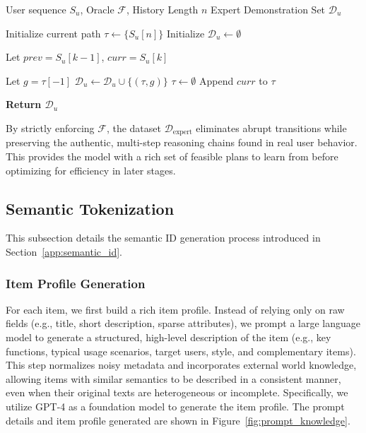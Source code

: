 \begin{algorithm}[tb]
   \caption{Goal-oriented Trajectory Mining}
   \label{alg:mining}
\begin{algorithmic}[1]
    User sequence $S_u$, Oracle $\mathcal{F}$, History Length $n$
    Expert Demonstration Set $\mathcal{D}_{u}$
   
   \STATE Initialize current path $\tau \leftarrow \{ S_u[n] \}$
   \STATE Initialize $\mathcal{D}_{u} \leftarrow \emptyset$

       \STATE Let $prev = S_u[k-1]$, $curr = S_u[k]$
       
           \STATE {}
               \STATE Let $g = \tau[-1]$ 
               \STATE $\mathcal{D}_{u} \leftarrow \mathcal{D}_{u} \cup \{(\tau, g)\}$ 
           \ENDIF
           \STATE $\tau \leftarrow \emptyset $ 
       \ENDIF
       \STATE Append $curr$ to $\tau$
   \ENDFOR
   
   \STATE \bfseries Return $\mathcal{D}_{u}$
\end{algorithmic}
\end{algorithm}

By strictly enforcing $\mathcal{F}$, the dataset $\mathcal{D}_{\text{expert}}$ eliminates abrupt transitions while preserving the authentic, multi-step reasoning chains found in real user behavior. This provides the model with a rich set of feasible plans to learn from before optimizing for efficiency in later stages.

\subsection{Semantic Tokenization}
\label{app:semantic}

This subsection details the semantic ID generation process introduced in Section~\ref{app:semantic_id}.

\subsubsection{Item Profile Generation}

For each item, we first build a rich item profile. Instead of relying only on raw fields (e.g., title, short description, sparse attributes), we prompt a large language model to generate a structured, high-level description of the item (e.g., key functions, typical usage scenarios, target users, style, and complementary items). This step normalizes noisy metadata and incorporates external world knowledge, allowing items with similar semantics to be described in a consistent manner, even when their original texts are heterogeneous or incomplete. Specifically, we utilize GPT-4 as a foundation model to generate the item profile. The prompt details and item profile generated are shown in Figure~\ref{fig:prompt_knowledge}.


